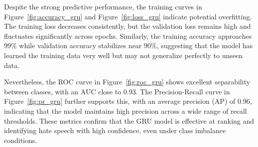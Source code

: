 Despite the strong predictive performance, the training curves in Figure~\ref{fig:accuracy_gru} and Figure~\ref{fig:loss_gru} indicate potential overfitting. The training loss decreases consistently, but the validation loss remains high and fluctuates significantly across epochs. Similarly, the training accuracy approaches 99\% while validation accuracy stabilizes near 90\%, suggesting that the model has learned the training data very well but may not generalize perfectly to unseen data.

Nevertheless, the ROC curve in Figure~\ref{fig:roc_gru} shows excellent separability between classes, with an AUC close to 0.93. The Precision-Recall curve in Figure~\ref{fig:pr_gru} further supports this, with an average precision (AP) of 0.96, indicating that the model maintains high precision across a wide range of recall thresholds. These metrics confirm that the GRU model is effective at ranking and identifying hate speech with high confidence, even under class imbalance conditions.